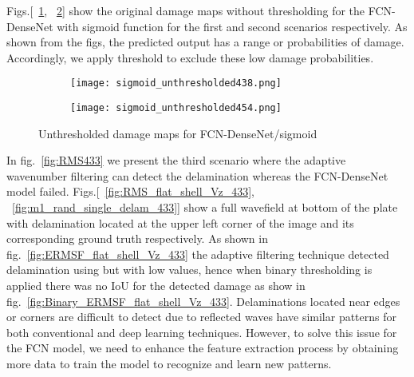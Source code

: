 	Figs.[~\ref{fig:unthresholded438}, ~\ref{fig:unthresholded454}] show the original damage maps without thresholding for the FCN-DenseNet with sigmoid function for the first and second scenarios respectively. 
	As shown from the figs, the predicted output has a range or probabilities of damage. 
	Accordingly, we apply threshold to exclude these low damage probabilities.
	\begin{figure} [!h] 
		\centering
		\begin{subfigure}[b]{0.47\textwidth}
		\centering
		\texttt{[image: sigmoid\_unthresholded438.png]}
		\caption{}
		\label{fig:unthresholded438}
		\end{subfigure}
	\hfill	
	\begin{subfigure}[b]{0.47\textwidth}
		\centering 	
		\texttt{[image: sigmoid\_unthresholded454.png]}
		\caption{}
		\label{fig:unthresholded454}
	\end{subfigure}
	\caption{Unthresholded damage maps for FCN-DenseNet/sigmoid}
	\label{fig:unthresholded}
	\end{figure}
	In fig.~\ref{fig:RMS433} we present the third scenario where the adaptive wavenumber filtering can detect the delamination whereas the FCN-DenseNet model failed.
	Figs.[~\ref{fig:RMS_flat_shell_Vz_433}, ~\ref{fig:m1_rand_single_delam_433}] show a full wavefield at bottom of the plate with delamination located at the upper left corner of the image and its corresponding ground truth respectively.
	As shown in fig.~\ref{fig:ERMSF_flat_shell_Vz_433} the adaptive filtering technique detected delamination using but with low values, hence when binary thresholding is applied there was no IoU for the detected damage as show in fig.~\ref{fig:Binary_ERMSF_flat_shell_Vz_433}. 
	Delaminations located near edges or corners are difficult to detect due to reflected waves have similar patterns for both conventional and deep learning techniques. 
	However, to solve this issue for the FCN model, we need to enhance the feature extraction process by obtaining more data to train the model to recognize and learn new patterns.	
